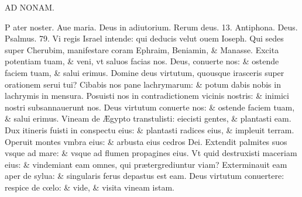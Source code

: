 \documentclass[a5paper,10pt]{book}
\def\ae{æ}
\def\AE{Æ}
\def\oe{œ}
\begin{document}
\begin{multicols*}{2}
\begin{center}
AD NONAM.
\end{center}
\vspace{-1em}
\par \noindent \color{red} P\color{black} ater noster. Aue maria. Deus in adiutorium. Rerum deus. 13.
\newline \color{red} Antiphona. \color{black} Deus. \color{red} Psalmus. 79. \color{black}
Vi regis Israel intende: qui deducis velut ouem Ioseph.
\newline \color{red} Q\color{black}ui sedes super Cherubim, manifestare coram Ephraim, Beniamin, \& Manasse.
\newline \color{red} E\color{black}xcita potentiam tuam, \& veni, vt saluos facias nos.
\newline \color{red} D\color{black}eus, conuerte nos: \& ostende faciem tuam, \& salui erimus.
\newline \color{red} D\color{black}omine deus virtutum, quousque irasceris super orationem serui tui?
\newline \color{red} C\color{black}ibabis nos pane lachrymarum: \& potum dabis nobis in lachrymis in mensura.
\newline \color{red} P\color{black}osuisti nos in contradictionem vicinis nostris: \& inimici nostri subsannauerunt nos.
\newline \color{red} D\color{black}eus virtutum conuerte nos: \& ostende faciem tuam, \& salui erimus.
\newline \color{red} V\color{black}ineam de \AE gypto transtulisti: eiecisti gentes, \& plantasti eam.
\newline \color{red} D\color{black}ux itineris fuisti in conspectu eius: \& plantasti radices eius, \& impleuit terram.
\newline \color{red} O\color{black}peruit montes vmbra eius: \& arbusta eius cedros Dei.
\newline \color{red} E\color{black}xtendit palmites suos vsque ad mare: \& vsque ad flumen propagines eius.
\newline \color{red} V\color{black}t quid destruxisti maceriam eius: \& vindemiant eam omnes, qui pr\ae tergrediuntur viam?
\newline \color{red} E\color{black}xterminauit eam aper de sylua: \& singularis ferus depastus est eam.
\newline \color{red} D\color{black}eus virtutum conuertere: respice de c\oe lo: \& vide, \& visita vineam istam.

\end{multicols*}
\end{document}

